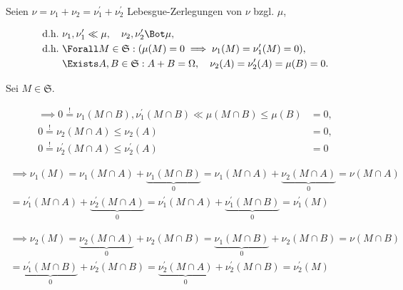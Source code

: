 \begin{solution}

\phantom{}


Seien $\nu = \nu_1 + \nu_2 = \nu_1^\prime + \nu_2^\prime$ Lebesgue-Zerlegungen von $\nu$ bzgl. $\mu$,

\begin{align*}
    \text{d.h.}~ & \nu_1, \nu_1^\prime \ll \mu, \quad \nu_2, \nu_2^\prime \Bot \mu, \\
    \text{d.h.}~ & \Forall M \in \mathfrak S:( \mu(M) = 0 \implies \nu_1(M) = \nu_1^\prime(M) = 0), \\
                 & \Exists A, B \in \mathfrak S: A + B = \Omega, \quad \nu_2(A) = \nu_2^\prime(A) = \mu(B) = 0.
\end{align*}

Sei $M \in \mathfrak S$.

\begin{align*}
    \implies
    0 \stackrel{!}{=} \nu_1(M \cap B), \nu_1^\prime(M \cap B) \ll \mu         (M \cap B) \leq \mu         (B) & = 0, \\
    0 \stackrel{!}{=}                                             \nu_2       (M \cap A) \leq \nu_2       (A) & = 0, \\
    0 \stackrel{!}{=}                                             \nu_2^\prime(M \cap A) \leq \nu_2^\prime(A) & = 0
\end{align*}

\begin{multline*}
    \implies
    \nu_1(M)
    =
    \nu_1(M \cap A) + \underbrace{\nu_1(M \cap B)}_0
    =
    \nu_1(M \cap A) + \underbrace{\nu_2(M \cap A)}_0
    =
    \nu(M \cap A) \\
    =
    \nu^\prime_1(M \cap A) + \underbrace{\nu^\prime_2(M \cap A)}_0
    =
    \nu_1^\prime(M \cap A) + \underbrace{\nu_1^\prime(M \cap B)}_0
    =
    \nu_1^\prime(M)
\end{multline*}

\begin{multline*}
    \implies
    \nu_2(M)
    =
    \underbrace{\nu_2(M \cap A)}_0 + \nu_2(M \cap B)
    =
    \underbrace{\nu_1(M \cap B)}_0 + \nu_2(M \cap B)
    =
    \nu(M \cap B) \\
    =
    \underbrace{\nu_1^\prime(M \cap B)}_0 + \nu_2^\prime(M \cap B)
    =
    \underbrace{\nu_2^\prime(M \cap A)}_0 + \nu_2^\prime(M \cap B)
    =
    \nu_2^\prime(M)
\end{multline*}

\end{solution}

